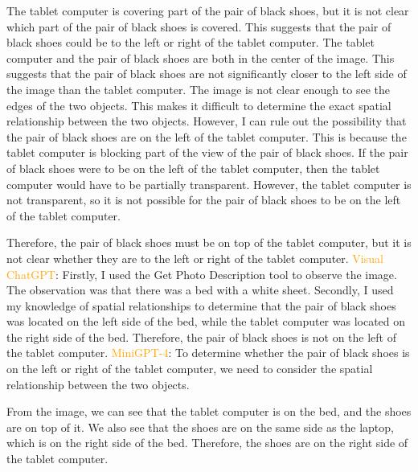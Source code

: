 \begin{enumerate}
    The tablet computer is covering part of the pair of black shoes, but it is not clear which part of the pair of black shoes is covered. This suggests that the pair of black shoes could be to the left or right of the tablet computer.
    The tablet computer and the pair of black shoes are both in the center of the image. This suggests that the pair of black shoes are not significantly closer to the left side of the image than the tablet computer.
    The image is not clear enough to see the edges of the two objects. This makes it difficult to determine the exact spatial relationship between the two objects.
    However, I can rule out the possibility that the pair of black shoes are on the left of the tablet computer. This is because the tablet computer is blocking part of the view of the pair of black shoes. If the pair of black shoes were to be on the left of the tablet computer, then the tablet computer would have to be partially transparent. However, the tablet computer is not transparent, so it is not possible for the pair of black shoes to be on the left of the tablet computer.
    
    Therefore, the pair of black shoes must be on top of the tablet computer, but it is not clear whether they are to the left or right of the tablet computer.
    \subitem \textcolor{orange}{Visual ChatGPT}: Firstly, I used the Get Photo Description tool to observe the image. The observation was that there was a bed with a white sheet. Secondly, I used my knowledge of spatial relationships to determine that the pair of black shoes was located on the left side of the bed, while the tablet computer was located on the right side of the bed. Therefore, the pair of black shoes is not on the left of the tablet computer.
    \subitem \textcolor{orange}{MiniGPT-4}: To determine whether the pair of black shoes is on the left or right of the tablet computer, we need to consider the spatial relationship between the two objects.

    From the image, we can see that the tablet computer is on the bed, and the shoes are on top of it. We also see that the shoes are on the same side as the laptop, which is on the right side of the bed. Therefore, the shoes are on the right side of the tablet computer.
\end{enumerate}
